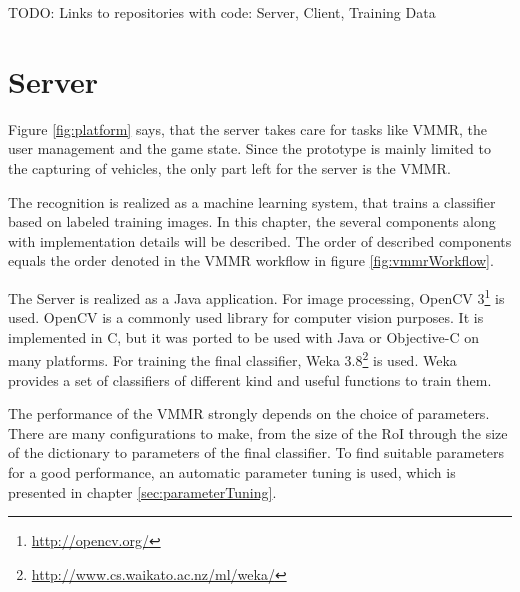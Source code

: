 TODO: Links to repositories with code: Server, Client, Training Data


\section{Server}
Figure \ref{fig:platform} says, that the server takes care for tasks like VMMR, the user management and the game state. Since the prototype is mainly limited to the capturing of vehicles, the only part left for the server is the VMMR.

The recognition is realized as a machine learning system, that trains a classifier based on labeled training images. In this chapter, the several components along with implementation details will be described. The order of described components equals the order denoted in the VMMR workflow in figure \ref{fig:vmmrWorkflow}.

The Server is realized as a Java application. For image processing, OpenCV 3\footnote{\url{http://opencv.org/}} is used. OpenCV is a commonly used library for computer vision purposes. It is implemented in C, but it was ported to be used with Java or Objective-C on many platforms. For training the final classifier, Weka 3.8\footnote{\url{http://www.cs.waikato.ac.nz/ml/weka/}} is used. Weka provides a set of classifiers of different kind and useful functions to train them.

The performance of the VMMR strongly depends on the choice of parameters. There are many configurations to make, from the size of the RoI through the size of the dictionary to parameters of the final classifier. To find suitable parameters for a good performance, an automatic parameter tuning is used, which is presented in chapter \ref{sec:parameterTuning}.

